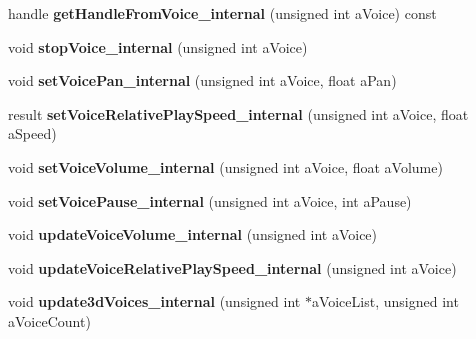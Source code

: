 \begin{DoxyCompactItemize}
\mbox{\label{class_so_loud_1_1_soloud_a53c595c42ae193da8ecfcf7fa786b07c}} 
handle {\bfseries get\+Handle\+From\+Voice\+\_\+internal} (unsigned int a\+Voice) const
\item 
\mbox{\label{class_so_loud_1_1_soloud_a15e72e6668738aa9bf63b5713f747066}} 
void {\bfseries stop\+Voice\+\_\+internal} (unsigned int a\+Voice)
\item 
\mbox{\label{class_so_loud_1_1_soloud_add67a52a2fd466d1ff7d2e1facbfee00}} 
void {\bfseries set\+Voice\+Pan\+\_\+internal} (unsigned int a\+Voice, float a\+Pan)
\item 
\mbox{\label{class_so_loud_1_1_soloud_a423d767c5ed56b874e5f2e0ce3c4b5d7}} 
result {\bfseries set\+Voice\+Relative\+Play\+Speed\+\_\+internal} (unsigned int a\+Voice, float a\+Speed)
\item 
\mbox{\label{class_so_loud_1_1_soloud_aed451bd929c17db9413caf8d9774450c}} 
void {\bfseries set\+Voice\+Volume\+\_\+internal} (unsigned int a\+Voice, float a\+Volume)
\item 
\mbox{\label{class_so_loud_1_1_soloud_a7a2839f1fe0b62c3d1b8605c50612d0e}} 
void {\bfseries set\+Voice\+Pause\+\_\+internal} (unsigned int a\+Voice, int a\+Pause)
\item 
\mbox{\label{class_so_loud_1_1_soloud_aab04ba285f3797e598808e5ef3976ea0}} 
void {\bfseries update\+Voice\+Volume\+\_\+internal} (unsigned int a\+Voice)
\item 
\mbox{\label{class_so_loud_1_1_soloud_ad570ece6204d830d97a39efc900a39e3}} 
void {\bfseries update\+Voice\+Relative\+Play\+Speed\+\_\+internal} (unsigned int a\+Voice)
\item 
\mbox{\label{class_so_loud_1_1_soloud_a4c2910ef49b99ff623068fa1cf4ce9ab}} 
void {\bfseries update3d\+Voices\+\_\+internal} (unsigned int $\ast$a\+Voice\+List, unsigned int a\+Voice\+Count)
\item 
\mbox{\label{class_so_loud_1_1_soloud_ae86bb258d76b486ea3988e046ce6d2c8}} 

\end{DoxyCompactItemize}
